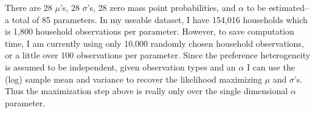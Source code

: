 \documentclass{article}
\begin{document}
There are 28 $\mu$'s, 28 $\sigma$'s, 28 zero mass point probabilities, and $\alpha$ to be estimated--a total of 85 parameters.   
In my useable dataset, I have 154,016 households which is 1,800 household observations per parameter.
However, to save computation time, I am currently using only 10,000 randomly chosen household observations, or a little over 100 observations per parameter.
Since the preference heterogeneity is assumed to be independent, given observation types and an $\alpha$ I can use the (log) sample mean and variance to recover the likelihood maximizing $\mu$ and $\sigma$'s.
Thus the maximization step above is really only over the single dimensional $\alpha$ parameter.
%
%
\end{document}
